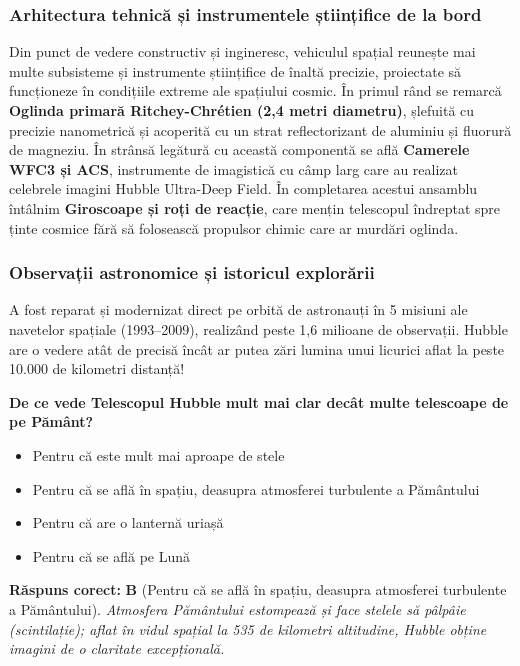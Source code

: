 \subsubsection*{Arhitectura tehnică și instrumentele științifice de la bord}
Din punct de vedere constructiv și ingineresc, vehiculul spațial reunește mai multe subsisteme și instrumente științifice de înaltă precizie, proiectate să funcționeze în condițiile extreme ale spațiului cosmic. În primul rând se remarcă \textbf{Oglinda primară Ritchey-Chrétien (2,4 metri diametru)}, șlefuită cu precizie nanometrică și acoperită cu un strat reflectorizant de aluminiu și fluorură de magneziu. În strânsă legătură cu această componentă se află \textbf{Camerele WFC3 și ACS}, instrumente de imagistică cu câmp larg care au realizat celebrele imagini \guillemotleft{}Hubble Ultra-Deep Field\guillemotright{}. În completarea acestui ansamblu întâlnim \textbf{Giroscoape și roți de reacție}, care mențin telescopul îndreptat spre ținte cosmice fără să folosească propulsor chimic care ar murdări oglinda.

\subsubsection*{Observații astronomice și istoricul explorării}
A fost reparat și modernizat direct pe orbită de astronauți în 5 misiuni ale navetelor spațiale (1993--2009), realizând peste 1,6 milioane de observații. Hubble are o vedere atât de precisă încât ar putea zări lumina unui licurici aflat la peste 10.000 de kilometri distanță!

\vspace{6pt}
\begin{tcolorbox}[orbitarquiz, title={\textbf{Întrebare de verificare \#44: Telescopul Spațial Hubble}}]
\textbf{De ce vede Telescopul Hubble mult mai clar decât multe telescoape de pe Pământ?}
\begin{itemize}[leftmargin=2.2em, itemsep=2pt, topsep=4pt]
  \item[$\square$ \textbf{A.}] Pentru că este mult mai aproape de stele
  \item[$\square$ \textbf{B.}] Pentru că se află în spațiu, deasupra atmosferei turbulente a Pământului
  \item[$\square$ \textbf{C.}] Pentru că are o lanternă uriașă
  \item[$\square$ \textbf{D.}] Pentru că se află pe Lună
\end{itemize}
\vspace{2pt}
{\footnotesize\color{orbitarMuted}\textbf{Răspuns corect:} \textbf{B} (Pentru că se află în spațiu, deasupra atmosferei turbulente a Pământului). \emph{Atmosfera Pământului estompează și face stelele să \guillemotleft{}pâlpâie\guillemotright{} (scintilație); aflat în vidul spațial la 535 de kilometri altitudine, Hubble obține imagini de o claritate excepțională.}}
\end{tcolorbox}
\clearpage


